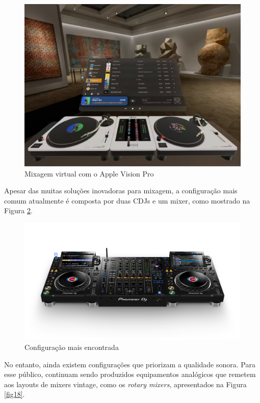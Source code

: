 \begin{figure}[h]
	\centering
    \includegraphics[scale=0.3]{figuras/fig16.eps}
	\caption{Mixagem virtual com o Apple Vision Pro \cite{macmagazineDesenvolvedorFala}}
	\label{fig16}
\end{figure}

Apesar das muitas soluções inovadoras para mixagem, a configuração mais comum atualmente é composta por duas CDJs e um mixer, como mostrado na Figura \ref{fig17}.

\begin{figure}[h]
	\centering
    \includegraphics[scale=0.3]{figuras/fig17.png}
	\caption{Configuração mais encontrada \cite{pioneerdjDJMA94channel}}
	\label{fig17}
\end{figure}

No entanto, ainda existem configurações que priorizam a qualidade sonora. Para esse público, continuam sendo produzidos equipamentos analógicos que remetem aos layouts de mixers vintage, como os \textit{rotary mixers}, apresentados na Figura \ref{fig18}.

